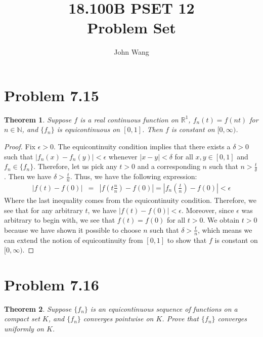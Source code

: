 \documentclass[psamsfonts]{amsart}
\title{18.100B PSET 12\\
Problem Set }
\author{John Wang}
\newtheorem{thm}{Theorem}[section]
\theoremstyle{definition}
\theoremstyle{remark}
\numberwithin{equation}{section}
\begin{document}
\maketitle

\section{Problem 7.15}

\begin{thm}
Suppose $f$ is a real continuous function on $\mathbb{R}^1$, $f_n(t) = f(nt)$ for $n \in \mathbb{N}$, and $\{ f_n \}$ is equicontinuous on $[0,1]$. Then $f$ is constant on $[0,\infty)$. 
\end{thm}

\begin{proof}
Fix $\epsilon > 0$. The equicontinuity condition implies that there exists a $\delta > 0$ such that $|f_n(x) - f_n(y)| < \epsilon$ whenever $|x - y| < \delta$ for all $x,y \in [0,1]$ and $f_n \in \{ f_n \}$. Therefore, let us pick any $t > 0$ and a corresponding $n$ such that $n > \frac{t}{\delta}$. Then we have $\delta > \frac{t}{n}$. Thus, we have the following expression:
\begin{eqnarray}
|f(t) - f(0)| &=& \left|f \left(t \frac{n}{n} \right) - f(0)\right| = \left| f_n \left(\frac{t}{n} \right) - f(0) \right| < \epsilon
\end{eqnarray}
Where the last inequality comes from the equicontinuity condition. Therefore, we see that for any arbitrary $t$, we have $|f(t) - f(0)| < \epsilon$. Moreover, since $\epsilon$ was arbitrary to begin with, we see that $f(t) = f(0)$ for all $t > 0$. We obtain $t>0$ because we have shown it possible to choose $n$ such that $\delta > \frac{t}{n}$, which means we can extend the notion of equicontinuity from $[0,1]$ to show that $f$ is constant on $[0,\infty)$.
\end{proof}

\section{Problem 7.16}

\begin{thm}
Suppose $\{ f_n \}$ is an equicontinuous sequence of functions on a compact set $K$, and $\{ f_n \}$ converges pointwise on $K$. Prove that $\{ f_n \}$ converges uniformly on $K$. 
\end{thm}
\end{document}

